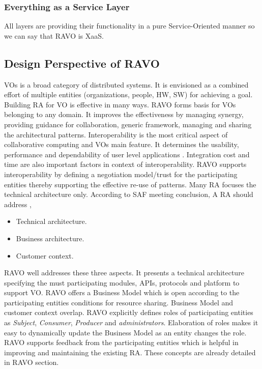 \documentclass[]{article}
\begin{document}
\subsubsection{\large{Everything as a Service Layer}}

All layers are providing their functionality in a pure Service-Oriented manner so we can say that RAVO is XaaS.


\subsection{Design Perspective of RAVO}
VOs is a broad category of distributed systems. It is envisioned as a combined effort of multiple entities (organizations, people, HW, SW) for achieving a goal. Building RA for VO is effective in many ways. RAVO forms basis for VOs belonging to any domain. It improves the effectiveness by managing synergy, providing guidance for collaboration, generic framework, managing and sharing the architectural patterns.
Interoperability is the most critical aspect of collaborative computing and VOs main feature. It determines the usability, performance and dependability of user level applications \cite{Gerrit}. Integration cost and time are also important factors in context of interoperability. RAVO supports interoperability by defining a negotiation model/trust for the participating entities thereby supporting the effective re-use of patterns.
Many RA focuses the technical architecture only. According to SAF meeting conclusion, A RA should address \cite{Gerrit},
\begin{itemize}
\item Technical architecture.
\item Business architecture.
\item Customer context.
\end{itemize}

RAVO well addresses these three aspects. It presents a technical architecture specifying the must participating modules, APIs, protocols and platform to support VO. RAVO offers a Business Model which is open according to the participating entities conditions for resource sharing. Business Model and customer context overlap. RAVO explicitly defines roles of participating entities as \emph{Subject}, \emph{Consumer}, \emph{Producer} and \emph{administrators}. Elaboration of roles makes it easy to dynamically update the Business Model as an entity changes the role. RAVO supports feedback from the participating entities which is helpful in improving and maintaining the existing RA. These concepts are already detailed in RAVO section.
\end{document}
